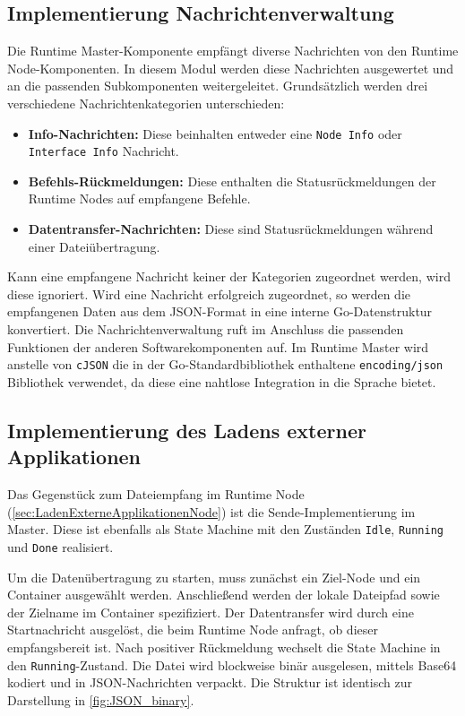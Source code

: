\subsection{Implementierung Nachrichtenverwaltung}
Die Runtime Master-Komponente empfängt diverse Nachrichten von den Runtime Node-Komponenten. In diesem Modul werden diese Nachrichten ausgewertet und an die passenden Subkomponenten weitergeleitet. Grundsätzlich werden drei verschiedene Nachrichtenkategorien unterschieden:

\begin{itemize}
    \item \textbf{Info-Nachrichten:} Diese beinhalten entweder eine \texttt{Node Info} oder \texttt{Interface Info} Nachricht.
    \item \textbf{Befehls-Rückmeldungen:} Diese enthalten die Statusrückmeldungen der Runtime Nodes auf empfangene Befehle.
    \item \textbf{Datentransfer-Nachrichten:} Diese sind Statusrückmeldungen während einer Dateiübertragung.
\end{itemize}

Kann eine empfangene Nachricht keiner der Kategorien zugeordnet werden, wird diese ignoriert. Wird eine Nachricht erfolgreich zugeordnet, so werden die empfangenen Daten aus dem \gls{JSON}-Format in eine interne Go-Datenstruktur konvertiert. Die Nachrichtenverwaltung ruft im Anschluss die passenden Funktionen der anderen Softwarekomponenten auf. Im Runtime Master wird anstelle von \texttt{cJSON} die in der Go-Standardbibliothek enthaltene \texttt{encoding/json} Bibliothek verwendet, da diese eine nahtlose Integration in die Sprache bietet.

\subsection{Implementierung des Ladens externer Applikationen}
Das Gegenstück zum Dateiempfang im Runtime Node (\autoref{sec:LadenExterneApplikationenNode}) ist die Sende-Implementierung im Master. Diese ist ebenfalls als State Machine mit den Zuständen \texttt{Idle}, \texttt{Running} und \texttt{Done} realisiert. 

Um die Datenübertragung zu starten, muss zunächst ein Ziel-Node und ein Container ausgewählt werden. Anschließend werden der lokale Dateipfad sowie der Zielname im Container spezifiziert. Der Datentransfer wird durch eine Startnachricht ausgelöst, die beim Runtime Node anfragt, ob dieser empfangsbereit ist. Nach positiver Rückmeldung wechselt die State Machine in den \texttt{Running}-Zustand. Die Datei wird blockweise binär ausgelesen, mittels Base64 kodiert und in \gls{JSON}-Nachrichten verpackt. Die Struktur ist identisch zur Darstellung in \autoref{fig:JSON_binary}. 

